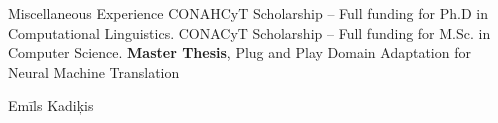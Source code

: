 \begin{rubric}{Miscellaneous Experience}
\entry*[2021]%
     CONAHCyT Scholarship -- Full funding for Ph.D in Computational Linguistics.
\entry*[2015]%
    CONACyT Scholarship -- Full funding for M.Sc. in Computer Science.
\entry*[2023] \textbf{Master Thesis}, Plug and Play Domain Adaptation for Neural Machine Translation\par
Emīls Kadiķis

\end{rubric}
